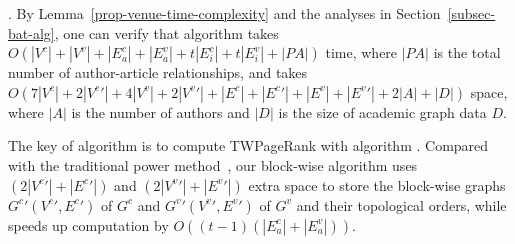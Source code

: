
.
%
By Lemma~\ref{prop-venue-time-complexity} and the analyses in Section~\ref{subsec-bat-alg}, one can verify that algorithm \batensemble takes $O(|V^c|+|V^v|+|E^c_a|+|E^v_a|+t|E^c_i|+t|E^v_i|+|PA|)$ time, where $|PA|$ is the total number of author-article relationships, and takes $O(7|V^c|+2|V^c{'}|+4|V^v|+2|V^v{'}|+|E^c|+|E^c{'}|+|E^v|+|E^v{'}|+2|A|+|D|)$ space, where $|A|$ is the number of authors and $|D|$ is the size of academic graph data $D$.

The key of algorithm \batensemble is to compute TWPageRank with algorithm \twprscc.
Compared with the traditional power method~\cite{Brin98:PageRank}, our block-wise algorithm \twprscc uses $(2|V^c{'}|+|E^c{'}|)$ and $(2|V^v{'}|+|E^v{'}|)$ extra space to store the block-wise graphs $G^c{'}(V^c{'},E^c{'})$ of $G^c$ and $G^v{'}(V^v{'},E^v{'})$ of $G^v$ and their topological orders, while speeds up computation by $O((t-1)(|E^c_a|+|E^v_a|))$.








